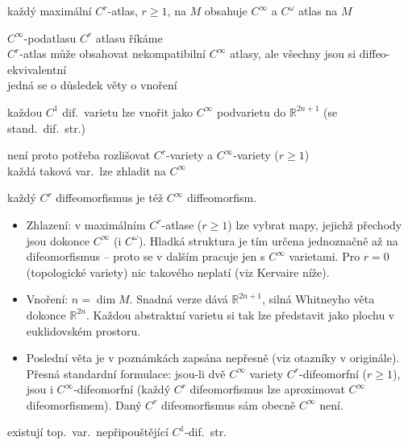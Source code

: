 \begin{veta}
každý maximální $C^r$-atlas, $r\geq 1$, na $M$ obsahuje $C^\infty$ a $C^\omega$ atlas na $M$
\end{veta}
$C^\infty$-podatlasu $C^r$ atlasu říkáme  \\
$C^r$-atlas může obsahovat nekompatibilní $C^\infty$ atlasy, ale všechny jsou si diffeo-ekvivalentní \\
jedná se o důsledek věty o vnoření

\begin{veta}
každou $C^1$ dif.\ varietu lze vnořit jako $C^\infty$ podvarietu do $\mathbb{R}^{2n+1}$ (se stand.\ dif.\ str.)
\end{veta}
není proto potřeba rozlišovat $C^r$-variety a $C^\infty$-variety ($r\geq 1$) \\
\quad každá taková var.\ lze  zhladit na $C^\infty$

\begin{veta}
každý $C^r$ diffeomorfismus je též $C^\infty$ diffeomorfism. \\
\end{veta}

\begin{vysvetleni}
\begin{itemize}[nosep]
  \item Zhlazení: v maximálním $C^r$-atlase ($r\geq1$) lze vybrat mapy, jejichž přechody jsou dokonce $C^\infty$ (i $C^\omega$). Hladká struktura je tím určena jednoznačně až na difeomorfismus -- proto se v dalším pracuje jen s $C^\infty$ varietami. Pro $r=0$ (topologické variety) nic takového neplatí (viz Kervaire níže).
  \item Vnoření: $n=\dim M$. Snadná verze dává $\mathbb{R}^{2n+1}$, silná Whitneyho věta dokonce $\mathbb{R}^{2n}$. Každou abstraktní varietu si tak lze představit jako plochu v euklidovském prostoru.
  \item Poslední věta je v poznámkách zapsána nepřesně (viz otazníky v originále). Přesná standardní formulace: jsou-li dvě $C^\infty$ variety $C^r$-difeomorfní ($r\geq1$), jsou i $C^\infty$-difeomorfní (každý $C^r$ difeomorfismus lze aproximovat $C^\infty$ difeomorfismem). Daný $C^r$ difeomorfismus sám obecně $C^\infty$ není.
\end{itemize}
\end{vysvetleni}

\begin{veta}
existují top.\ var.\ nepřipouštějící $C^1$-dif.\ str.
\end{veta}

